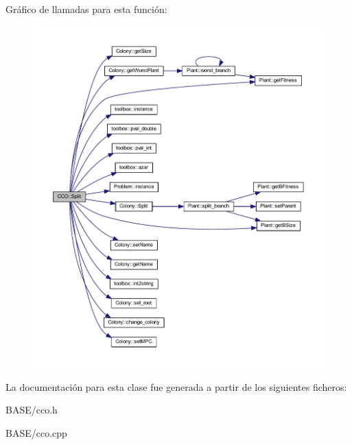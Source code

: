 Gráfico de llamadas para esta función\+:
\nopagebreak
\begin{figure}[H]
\begin{center}
\leavevmode
\includegraphics[width=350pt]{class_c_c_o_a5804afdd4b0361d7507fab4b3ab71703_cgraph}
\end{center}
\end{figure}




La documentación para esta clase fue generada a partir de los siguientes ficheros\+:\begin{DoxyCompactItemize}
\item 
B\+A\+S\+E/cco.\+h\item 
B\+A\+S\+E/cco.\+cpp\end{DoxyCompactItemize}
